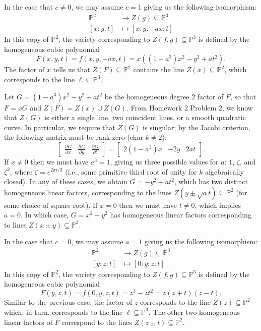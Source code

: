 \documentclass[12pt]{article}
\theoremstyle{definition}
\renewcommand{\P}{\mathbb{P}}
\newcommand{\<}{\langle}
\renewcommand{\>}{\rangle}
\newcommand{\mat}[1]{\begin{bmatrix}#1\end{bmatrix}}
\newcommand{\pdv}[3][]{\frac{\partial^{#1}#2}{\partial{#3}^{#1}}}
\begin{document}
In the case that $c \ne 0$, we may assume $c = 1$ giving us the following isomorphism:
\begin{align*}
    \P^2 &\longrightarrow Z(g) \subseteq \P^3 \\
    [x : y : t] &\longmapsto [x : y : -ax : t]
\end{align*}
In this copy of $\P^2$, the variety corresponding to $Z(f, g) \subseteq \P^3$ is defined by the homogeneous cubic polynomial
\[
    F(x, y, t)
        = f(x, y, -ax, t)
        = x\left((1 - a^3)x^2 - y^2 + at^2\right).
\]
The factor of $x$ tells us that $Z(F) \subseteq \P^2$ contains the line $Z(x) \subseteq \P^2$, which corresponds to the line $\ell \subseteq \P^3$.

Let $G = (1 - a^3)x^2 - y^2 + at^2$ be the homogeneous degree $2$ factor of $F$, so that $F = xG$ and $Z(F) = Z(x) \cup Z(G)$.
From Homework 2 Problem 2, we know that $Z(G)$ is either a single line, two coincident lines, or a smooth quadratic curve.
In particular, we require that $Z(G)$ is singular; by the Jacobi criterion, the following matrix must be rank zero (char $k \ne 2$):
\[
    \mat{\pdv{G}{x} & \pdv{G}{y} & \pdv{G}{t}}
        = \mat{2(1 - a^3)x & -2y & 2at}.
\]
If $x \ne 0$ then we must have $a^3 = 1$, giving us three possible values for $a$: $1$, $\zeta$, and $\zeta^2$, where $\zeta = e^{2\pi i/3}$ (i.e., some primitive third root of unity for $k$ algebraically closed).
In any of these cases, we obtain $G = -y^2 + at^2$, which has two distinct homogeneous linear factors, corresponding to the lines $Z(y \pm \sqrt{a}t) \subseteq \P^2$ (for some choice of square root).
If $x = 0$ then we must have $t \ne 0$, which implies $a = 0$.
In which case, $G = x^2 - y^2$ has homogeneous linear factors corresponding to lines $Z(x \pm y) \subseteq \P^2$.

In the case that $c = 0$, we may assume $a = 1$ giving us the following isomorphism:
\begin{align*}
    \P^2 &\longrightarrow Z(g) \subseteq \P^3 \\
    [y : z : t] &\longmapsto [0 : y : z : t]
\end{align*}
In this copy of $\P^2$, the variety corresponding to $Z(f, g) \subseteq \P^3$ is defined by the homogeneous cubic polynomial
\[
    F(y, z, t) 
        = f(0, y, z, t)
        = z^3 - zt^2
        = z(z + t)(z - t).
\]
Similar to the previous case, the factor of $z$ corresponds to the line $Z(z) \subseteq \P^2$ which, in turn, corresponds to the line $\ell \subseteq \P^3$.
The other two homogeneous linear factors of $F$ correspond to the lines $Z(z \pm t) \subseteq \P^2$.
\end{document}
